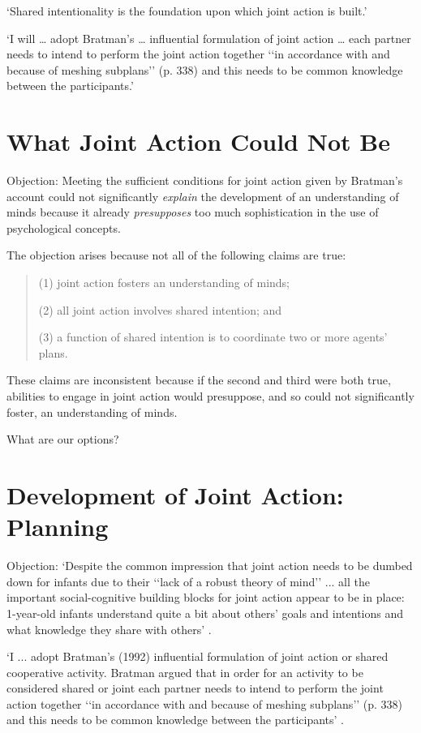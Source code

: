 \documentclass[12pt]{extarticle}
\begin{document}
\begin{multicols}{3}
‘Shared intentionality is the foundation upon which joint action is built.’
\citep[p.~381]{carpenter:2009_howjoint}

‘I will … adopt Bratman’s … influential formulation of joint action …
each partner needs to
intend to perform the joint action together ‘‘in accordance with and because of
meshing subplans’’ (p. 338) and this needs to be common knowledge between the participants.’
\citep[][p.\ 281]{carpenter:2009_howjoint}



\section{What Joint Action Could Not Be}

Objection: Meeting the sufficient conditions for joint action given by
Bratman’s account could not significantly \textit{explain} the development
of an understanding of minds because it already \textit{presupposes} too
much sophistication in the use of psychological concepts.

The objection arises because not all of the following claims are true:
%
\begin{quote}
(1) joint action fosters an understanding of minds;

(2) all joint action involves shared intention; and

(3) a function of shared intention is to coordinate two or more agents’ plans.
\end{quote}
%
These claims are inconsistent because if the second and third were both true, abilities to engage in joint action would presuppose, and so could not significantly foster, an understanding of minds.

What are our options?



\section{Development of Joint Action: Planning}

Objection: ‘Despite the common impression that joint action needs to be dumbed down
for infants due to their ‘‘lack of a robust theory of mind’’
... all the important social-cognitive building
blocks for joint action appear to be in place:
1-year-old infants
understand quite a bit about others’ goals and intentions and what
knowledge they share with others’
\citep[p.~383]{carpenter:2009_howjoint}.

‘I ... adopt Bratman’s (1992) influential formulation of joint
action or shared cooperative activity.
Bratman argued that in order for
an activity to be considered shared or joint each partner needs to intend
to perform the joint action together ‘‘in accordance with and because of
meshing subplans’’ (p. 338) and this needs to be common knowledge between
the participants’
\citep[p.~381]{carpenter:2009_howjoint}.


\end{multicols}
\end{document}
